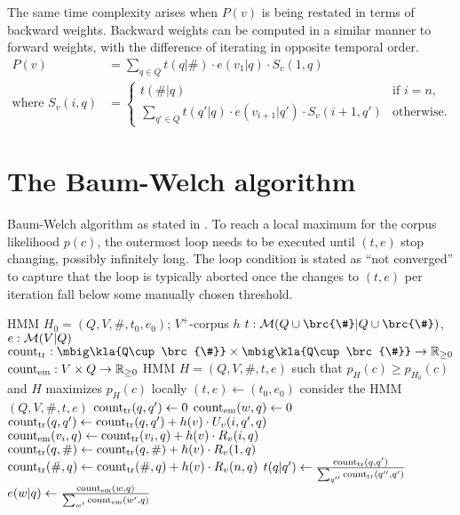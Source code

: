 The same time complexity arises when $P(v)$ is being restated in terms of
backward weights. Backward weights can be computed in a similar manner to
forward weights, with the difference of iterating in opposite temporal order.
\begin{align*}
 P(v) &= \sum_{q\in Q} t(q|\#) \cdot e(v_1|q) \cdot S_v(1,q) \\
 \text{where } S_v(i,q) &= \begin{cases}
  t(\#|q) & \text{if }i=n, \\
  \sum_{q'\in Q} t(q'|q) \cdot e(v_{i+1}|q') \cdot S_v(i+1,q') & \text{otherwise}.
 \end{cases}
\end{align*}

\section{The Baum-Welch algorithm}

\begin{algorithm}[p!]
 \caption{Baum-Welch algorithm as stated in \cite{vogler2015}. To reach a local
 maximum for the corpus likelihood $p(c)$, the outermost loop needs to be
 executed until $(t,e)$ stop changing, possibly infinitely long. The loop
 condition is stated as ``not converged'' to capture that the loop is typically
 aborted once the changes to $(t,e)$ per iteration fall below some manually
 chosen threshold. \label{alg:bw-vogler}}
 \begin{algorithmic}[1]
  \algorithmheader[Input:] HMM $H_0 = (Q,V,\#,t_0,e_0)$; $V^+$-corpus $h$
  \algorithmheader[Variables:] $t:\um(Q\cup\brc{\#}|Q\cup\brc{\#})$, $e:\mathcal M(V|Q)$
  \algorithmheader             $\cnt_\mathrm{tr}: \mbig\kla{Q\cup\brc{\#}}\times\mbig\kla{Q\cup\brc{\#}}\to\zr_{\geq0}$
  \algorithmheader             $\operatorname{count}_\mathrm{em}: V\times Q\to\mathbb R_{\geq0}$
  \algorithmheader[Output:] HMM $H = (Q,V,\#,t,e)$
  \algorithmheader such that $p_H(c) \geq p_{H_0}(c)$ and $H$ maximizes $p_H(c)$ locally
  \STATE $(t,e) \leftarrow (t_0,e_0)$
   \STATE consider the HMM $(Q,V,\#,t,e)$
   \STATE $\operatorname{count}_\mathrm{tr}(q,q') \leftarrow 0$ 
   \STATE $\operatorname{count}_\mathrm{em}(w,q) \leftarrow 0$ 
      \STATE $\operatorname{count}_\mathrm{tr}(q,q') \leftarrow \operatorname{count}_\mathrm{tr}(q,q') + h(v) \cdot U_v(i,q',q)$
     \ENDFOR
    \ENDFOR
      \STATE $\operatorname{count}_\mathrm{em}(v_i,q) \leftarrow \operatorname{count}_\mathrm{tr}(v_i,q) + h(v) \cdot R_v(i,q)$
     \ENDFOR
    \ENDFOR
     \STATE $\operatorname{count}_\mathrm{tr}(q,\#) \leftarrow \operatorname{count}_\mathrm{tr}(q,\#) + h(v) \cdot R_v(1,q)$
     \STATE $\operatorname{count}_\mathrm{tr}(\#,q) \leftarrow \operatorname{count}_\mathrm{tr}(\#,q) + h(v) \cdot R_v(n,q)$
    \ENDFOR
   \ENDFOR
    \STATE $t(q|q') \leftarrow \frac{\operatorname{count}_\mathrm{tr}(q,q')}{\sum_{q''} \operatorname{count}_\mathrm{tr}(q'',q')}$
   \ENDFOR
    \STATE $e(w|q) \leftarrow \frac{\operatorname{count}_\mathrm{em}(w,q)}{\sum_{w'} \operatorname{count}_\mathrm{em}(w',q)}$
   \ENDFOR
  \ENDWHILE
 \end{algorithmic}
\end{algorithm}

